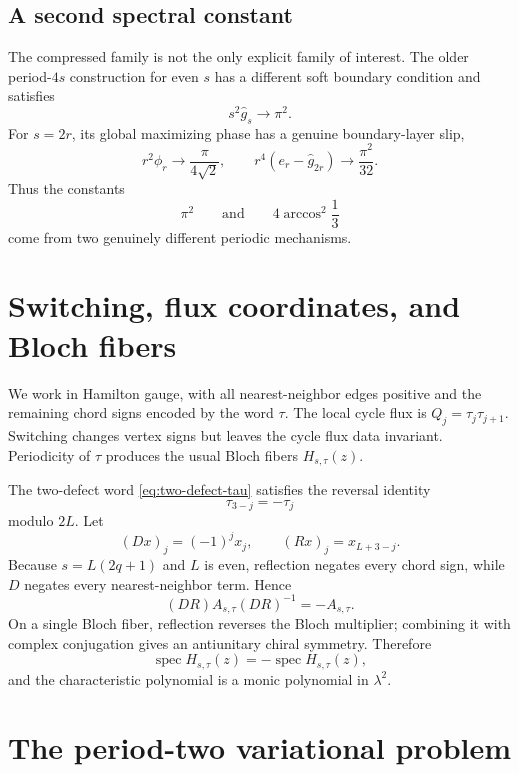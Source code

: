 \documentclass[11pt]{article}
\theoremstyle{remark}
\newcommand{\spec}{\operatorname{spec}}
\begin{document}
\subsection{A second spectral constant}

The compressed family is not the only explicit family of interest.  The
older period-$4s$ construction for even $s$ has a different soft boundary
condition and satisfies
\[
 s^2\widehat g_s\to\pi^2.
\]
For $s=2r$, its global maximizing phase has a genuine boundary-layer slip,
\[
 r^2\phi_r\to\frac{\pi}{4\sqrt2},
 \qquad
 r^4(e_r-\widehat g_{2r})\to\frac{\pi^2}{32}.
\]
Thus the constants
\[
 \pi^2
 \qquad\text{and}\qquad
 4\arccos^2\frac13
\]
come from two genuinely different periodic mechanisms.

\section{Switching, flux coordinates, and Bloch fibers}
\label{sec:prelim}

We work in Hamilton gauge, with all nearest-neighbor edges positive and the
remaining chord signs encoded by the word $\tau$.  The local cycle flux is
$Q_j=\tau_j\tau_{j+1}$.  Switching changes vertex signs but leaves the cycle
flux data invariant.  Periodicity of $\tau$ produces the usual Bloch
fibers $H_{s,\tau}(z)$.

The two-defect word \eqref{eq:two-defect-tau} satisfies the reversal identity
\begin{equation}
 \boxed{\tau_{3-j}=-\tau_j}
 \label{eq:reversal}
\end{equation}
modulo $2L$.  Let
\[
 (Dx)_j=(-1)^jx_j,
 \qquad
 (Rx)_j=x_{L+3-j}.
\]
Because $s=L(2q+1)$ and $L$ is even, reflection negates every chord sign,
while $D$ negates every nearest-neighbor term.  Hence
\[
 (DR)A_{s,\tau}(DR)^{-1}=-A_{s,\tau}.
\]
On a single Bloch fiber, reflection reverses the Bloch multiplier; combining
it with complex conjugation gives an antiunitary chiral symmetry.  Therefore
\begin{equation}
 \spec H_{s,\tau}(z)=-\spec H_{s,\tau}(z),
 \label{eq:chiral-spectrum}
\end{equation}
and the characteristic polynomial is a monic polynomial in $\lambda^2$.

\section{The period-two variational problem}
\label{sec:period-two}
\end{document}
